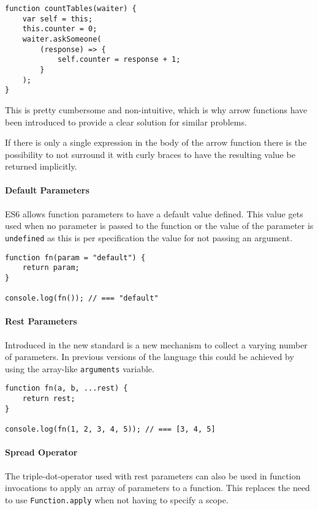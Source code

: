 \documentclass{bioinfo}
\begin{document}
\begin{lstlisting}
function countTables(waiter) {
    var self = this;
    this.counter = 0;
    waiter.askSomeone(
        (response) => {
            self.counter = response + 1;
        }
    );
}
\end{lstlisting}

This is pretty cumbersome and non-intuitive, which is why arrow functions
have been introduced to provide a clear solution for similar problems.

If there is only a single expression in the body of the arrow function there is
the possibility to not surround it with curly braces to have the resulting value
be returned implicitly.

\paragraph{Default Parameters\textcolon}
ES6 allows function parameters to have a default value defined. This value gets used when
no parameter is passed to the function or the value of the parameter is {\tt undefined} as
this is per specification the value for not passing an argument.

\begin{lstlisting}
function fn(param = "default") {
    return param;
}

console.log(fn()); // === "default"
\end{lstlisting}

\paragraph{Rest Parameters\textcolon}
Introduced in the new standard is a new mechanism to collect a varying number of parameters.
In previous versions of the language this could be achieved by using the array-like
{\tt arguments} variable.

\begin{lstlisting}
function fn(a, b, ...rest) {
    return rest;
}

console.log(fn(1, 2, 3, 4, 5)); // === [3, 4, 5]
\end{lstlisting}

\paragraph{Spread Operator}
The triple-dot-operator used with rest parameters can also be used in function invocations
to apply an array of parameters to a function. This replaces the need to use {\tt Function.apply}
when not having to specify a scope.
\end{document}
